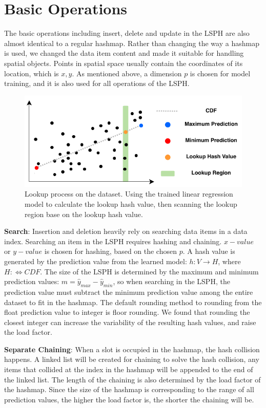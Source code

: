 \section{Basic Operations}
The basic operations including insert, delete and update in the LSPH are also almost identical to a regular hashmap. Rather than changing the way a hashmap is used, we changed the data item content and made it suitable for handling spatial objects. Points in spatial space usually contain the coordinates of its location, which is ${x, y}$. As mentioned above, a dimension $p$ is chosen for model training, and it is also used for all operations of the LSPH. 


\begin{figure}[ht]
\centering
\includegraphics{Figures/search.pdf}
\caption{Lookup process on the dataset. Using the trained linear regression model to calculate the lookup hash value, then scanning the lookup region base on the lookup hash value.}
\label{fig:search}
\end{figure}


\textbf{Search}: Insertion and deletion heavily rely on searching data items in a data index. Searching an item in the LSPH requires hashing and chaining. $x-value$ or $y-value$ is chosen for hashing, based on the chosen $p$. A hash value is generated by the prediction value from the learned model: $h : V \rightarrow H$, where $H: \Leftrightarrow CDF$. The size of the LSPH is determined by the maximum and minimum prediction values: $m = \hat{y}_{max} - \hat{y}_{min}$, so when searching in the LSPH, the prediction value must subtract the minimum prediction value among the entire dataset to fit in the hashmap. The default rounding method to rounding from the float prediction value to integer is floor rounding. We found that rounding the closest integer can increase the variability of the resulting hash values, and raise the load factor. 

\textbf{Separate Chaining}: When a slot is occupied in the hashmap, the hash collision happens. A linked list will be created for chaining to solve the hash collision, any items that collided at the index in the hashmap will be appended to the end of the linked list. The length of the chaining is also determined by the load factor of the hashmap. Since the size of the hashmap is corresponding to the range of all prediction values, the higher the load factor is, the shorter the chaining will be. 

